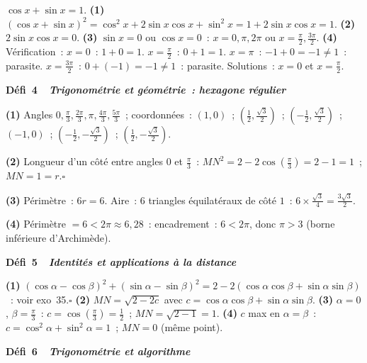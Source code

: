$\cos x+\sin x=1$.
\textbf{(1)} $(\cos x+\sin x)^2=\cos^2x+2\sin x\cos x+\sin^2x=1+2\sin x\cos x=1$.
\textbf{(2)} $2\sin x\cos x=0$.
\textbf{(3)} $\sin x=0$ ou $\cos x=0$~:
$x=0,\pi,2\pi$ ou $x=\frac{\pi}{2},\frac{3\pi}{2}$.
\textbf{(4)} V\'erification~:
$x=0$~: $1+0=1$.\checkmark\quad
$x=\frac{\pi}{2}$~: $0+1=1$.\checkmark\quad
$x=\pi$~: $-1+0=-1\ne1$~: parasite.\quad
$x=\frac{3\pi}{2}$~: $0+(-1)=-1\ne1$~: parasite.
Solutions~: $x=0$ et $x=\frac{\pi}{2}$.

\noindent{}
{\color{BO}\bfseries\small D\'efi~4~\textendash\ \textit{Trigonom\'etrie et g\'eom\'etrie~: hexagone r\'egulier}}
\par\smallskip

\textbf{(1)} Angles $0,\frac{\pi}{3},\frac{2\pi}{3},\pi,\frac{4\pi}{3},\frac{5\pi}{3}$~; coordonn\'ees~:
$(1,0)$~; $(\frac{1}{2},\frac{\sqrt{3}}{2})$~; $(-\frac{1}{2},\frac{\sqrt{3}}{2})$~;
$(-1,0)$~; $(-\frac{1}{2},-\frac{\sqrt{3}}{2})$~; $(\frac{1}{2},-\frac{\sqrt{3}}{2})$.

\textbf{(2)} Longueur d'un c\^ot\'e entre angles $0$ et $\frac{\pi}{3}$~:
$MN^2=2-2\cos(\frac{\pi}{3})=2-1=1$~; $MN=1=r$.\hfill$\square$

\textbf{(3)} P\'erim\`etre~: $6r=6$. Aire~: $6$ triangles \'equilat\'eraux de c\^ot\'e $1$~:
$6\times\frac{\sqrt{3}}{4}=\frac{3\sqrt{3}}{2}$.

\textbf{(4)} P\'erim\`etre $=6<2\pi\approx6{,}28$~:
encadrement~: $6<2\pi$, donc $\pi>3$ (borne inf\'erieure d'Archim\`ede).

\noindent{}
{\color{BO}\bfseries\small D\'efi~5~\textendash\ \textit{Identit\'es et applications \`a la distance}}
\par\smallskip

\textbf{(1)} $(\cos\alpha-\cos\beta)^2+(\sin\alpha-\sin\beta)^2
=2-2(\cos\alpha\cos\beta+\sin\alpha\sin\beta)$~: voir exo~35.\hfill$\square$
\textbf{(2)} $MN=\sqrt{2-2c}$ avec $c=\cos\alpha\cos\beta+\sin\alpha\sin\beta$.
\textbf{(3)} $\alpha=0$, $\beta=\frac{\pi}{3}$~: $c=\cos(\frac{\pi}{3})=\frac{1}{2}$~; $MN=\sqrt{2-1}=1$.\checkmark
\textbf{(4)} $c$ max en $\alpha=\beta$~: $c=\cos^2\alpha+\sin^2\alpha=1$~; $MN=0$ (m\^eme point).

\noindent{}
{\color{BO}\bfseries\small D\'efi~6~\textendash\ \textit{Trigonom\'etrie et algorithme \computer}}
\par\smallskip

